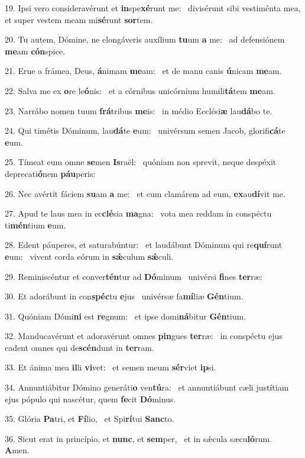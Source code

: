 19. Ipsi vero consideravérunt et \textbf{in}spe\textbf{xé}runt me: \ast\  divisérunt sibi vestiménta mea, et super vestem meam mi\textbf{sé}runt \textbf{sor}tem.\

20. Tu autem, Dómine, ne elongáveris auxílium \textbf{tu}um \textbf{a} me: \ast\  ad defensiónem \textbf{me}am \textbf{cón}spice.\

21. Erue a frámea, Deus, \textbf{á}nimam \textbf{me}am: \ast\  et de manu canis \textbf{ú}nicam \textbf{me}am.\

22. Salva me ex \textbf{o}re le\textbf{ó}nis: \ast\  et a córnibus unicórnium humili\textbf{tá}tem \textbf{me}am.\

23. Narrábo nomen tuum \textbf{frá}tribus \textbf{me}is: \ast\  in médio Ecclési\textbf{æ} lau\textbf{dá}bo te.\

24. Qui timétis Dóminum, lau\textbf{dá}te \textbf{e}um: \ast\  univérsum semen Jacob, glorifi\textbf{cá}te \textbf{e}um.\

25. Tímeat eum omne \textbf{se}men \textbf{Is}raël: \ast\  quóniam non sprevit, neque despéxit deprecati\textbf{ó}nem \textbf{páu}peris:\

26. Nec avértit fáciem \textbf{su}am \textbf{a} me: \ast\  et cum clamárem ad eum, \textbf{ex}au\textbf{dí}vit me.\

27. Apud te laus mea in ec\textbf{clé}sia \textbf{ma}gna: \ast\  vota mea reddam in conspéctu ti\textbf{mén}tium \textbf{e}um.\

28. Edent páuperes, et saturabúntur: \dag\  et laudábunt Dóminum qui re\textbf{quí}runt \textbf{e}um: \ast\  vivent corda eórum in \textbf{sǽ}culum \textbf{sǽ}culi.\

29. Reminiscéntur et conver\textbf{tén}tur ad \textbf{Dó}minum \ast\  univérsi \textbf{fi}nes \textbf{ter}ræ:\

30. Et adorábunt in con\textbf{spéc}tu \textbf{e}jus \ast\  univérsæ fa\textbf{mí}liæ \textbf{Gén}tium.\

31. Quóniam Dómi\textbf{ni} est \textbf{re}gnum: \ast\  et ipse domi\textbf{ná}bitur \textbf{Gén}tium.\

32. Manducavérunt et adoravérunt omnes \textbf{pin}gues \textbf{ter}ræ: \ast\  in conspéctu ejus cadent omnes qui de\textbf{scén}dunt in \textbf{ter}ram.\

33. Et ánima mea \textbf{il}li \textbf{vi}vet: \ast\  et semen meum \textbf{sér}viet \textbf{ip}si.\

34. Annuntiábitur Dómino generáti\textbf{o} ven\textbf{tú}ra: \ast\  et annuntiábunt cæli justítiam ejus pópulo qui nascétur, quem \textbf{fe}cit \textbf{Dó}minus.\

35. Glória \textbf{Pa}tri, et \textbf{Fí}lio, \ast\  et Spi\textbf{rí}tui \textbf{Sanc}to.\

36. Sicut erat in princípio, et \textbf{nunc}, et \textbf{sem}per, \ast\  et in sǽcula sæcu\textbf{ló}rum. \textbf{A}men.\

